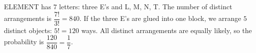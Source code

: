ELEMENT has $7$ letters: three E's and L, M, N, T. The number of distinct arrangements is $\dfrac{7!}{3!}=840$. If the three E's are glued into one block, we arrange $5$ distinct objects: $5!=120$ ways. All distinct arrangements are equally likely, so the probability is $\dfrac{120}{840}=\boxed{\dfrac{1}{7}}$.
